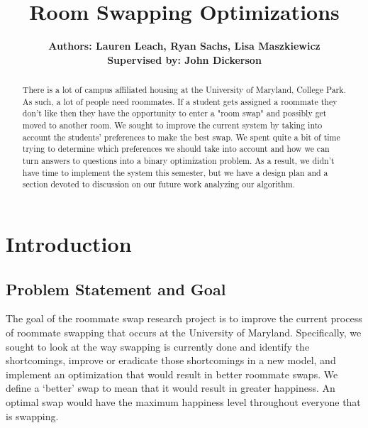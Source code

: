 \documentclass[12pt]{article}
\title{Room Swapping Optimizations}
\begin{document}
\maketitle

\begin{center}
\author{\textbf {Authors: Lauren Leach, Ryan Sachs, Lisa Maszkiewicz\\ \footnotesize Supervised by: John Dickerson\\ }} 
 

\begin{abstract}
There is a lot of campus affiliated housing at the University of Maryland, College Park. As such, a lot of people need roommates. If a student gets assigned a roommate they don't like then they have the opportunity to enter a "room swap" and possibly get moved to another room. We sought to improve the current system by taking into account the students' preferences to make the best swap. We spent quite a bit of time trying to determine which preferences we should take into account and how we can turn answers to questions into a binary optimization problem. As a result, we didn't have time to implement the system this semester, but we have a design plan and a section devoted to discussion on our future work analyzing our algorithm.
\end{abstract}

\end{center}

\section{Introduction}

\subsection{Problem Statement and Goal}
The goal of the roommate swap research project is to improve the current process of roommate swapping that occurs at the University of Maryland. Specifically, we sought to look at the way swapping is currently done and identify the shortcomings, improve or eradicate those shortcomings in a new model, and implement an optimization that would result in better roommate swaps. We define a ‘better’ swap to mean that it would result in greater happiness. An optimal swap would have the maximum happiness level throughout everyone that is swapping.
\end{document}
